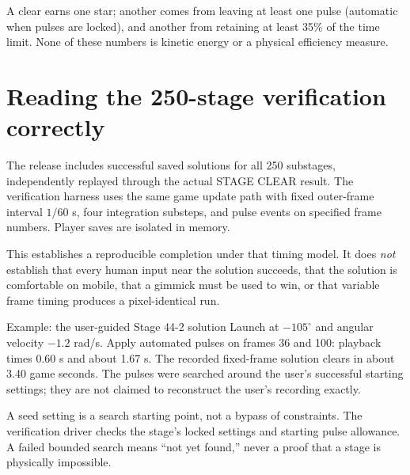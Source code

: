 \documentclass[11pt,a4paper]{article}
\begin{document}
A clear earns one star; another comes from leaving at least one pulse (automatic when pulses are locked), and another from retaining at least 35\% of the time limit. None of these numbers is kinetic energy or a physical efficiency measure.

\section{Reading the 250-stage verification correctly}
The release includes successful saved solutions for all 250 substages, independently replayed through the actual STAGE CLEAR result. The verification harness uses the same game update path with fixed outer-frame interval \(1/60\) s, four integration substeps, and pulse events on specified frame numbers. Player saves are isolated in memory.

This establishes a reproducible completion under that timing model. It does \emph{not} establish that every human input near the solution succeeds, that the solution is comfortable on mobile, that a gimmick must be used to win, or that variable frame timing produces a pixel-identical run.
\begin{idea}{Example: the user-guided Stage 44-2 solution}
Launch at \(-105^\circ\) and angular velocity \(-1.2\) rad/s. Apply automated pulses on frames 36 and 100: playback times 0.60 s and about 1.67 s. The recorded fixed-frame solution clears in about 3.40 game seconds. The pulses were searched around the user's successful starting settings; they are not claimed to reconstruct the user's recording exactly.
\end{idea}
A seed setting is a search starting point, not a bypass of constraints. The verification driver checks the stage's locked settings and starting pulse allowance. A failed bounded search means ``not yet found,'' never a proof that a stage is physically impossible.
\end{document}
